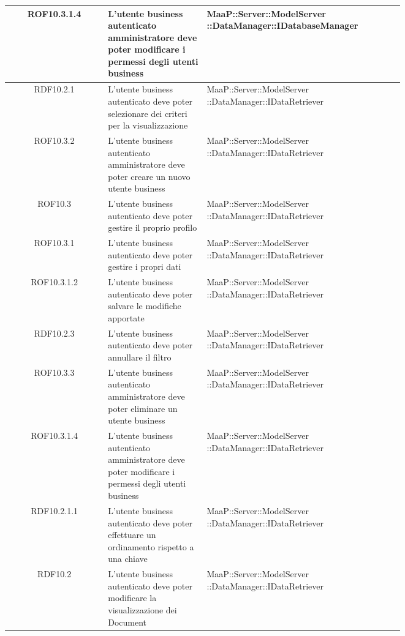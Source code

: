 \begin{center}
\begin{longtable}{|c|p{0.25\linewidth}|p{0.5\linewidth}|}
\midrule
ROF10.3.1.4
& L'utente business autenticato amministratore deve poter modificare i permessi degli utenti business
& MaaP::Server::ModelServer ::DataManager::IDatabaseManager\\

\midrule
RDF10.2.1
& L'utente business autenticato deve poter selezionare dei criteri per la visualizzazione
& MaaP::Server::ModelServer ::DataManager::IDataRetriever\\

\midrule
ROF10.3.2
& L'utente business autenticato amministratore deve poter creare un nuovo utente business
& MaaP::Server::ModelServer ::DataManager::IDataRetriever\\

\midrule
ROF10.3
& L'utente business autenticato deve poter gestire il proprio profilo
& MaaP::Server::ModelServer ::DataManager::IDataRetriever\\

\midrule
ROF10.3.1
& L'utente business autenticato deve poter gestire i propri dati
& MaaP::Server::ModelServer ::DataManager::IDataRetriever\\

\midrule
ROF10.3.1.2
& L'utente business autenticato deve poter  salvare le modifiche apportate
& MaaP::Server::ModelServer ::DataManager::IDataRetriever\\

\midrule
RDF10.2.3
& L'utente business autenticato deve poter annullare il filtro
& MaaP::Server::ModelServer ::DataManager::IDataRetriever\\

\midrule
ROF10.3.3
& L'utente business autenticato amministratore deve poter eliminare un utente business
& MaaP::Server::ModelServer ::DataManager::IDataRetriever\\

\midrule
ROF10.3.1.4
& L'utente business autenticato amministratore deve poter modificare i permessi degli utenti business
& MaaP::Server::ModelServer ::DataManager::IDataRetriever\\

\midrule
RDF10.2.1.1
& L'utente business autenticato deve poter effettuare un ordinamento rispetto a una chiave
& MaaP::Server::ModelServer ::DataManager::IDataRetriever\\

\midrule
RDF10.2
& L'utente business autenticato deve poter modificare la visualizzazione dei Document
& MaaP::Server::ModelServer ::DataManager::IDataRetriever\\


\end{longtable}
\end{center}
